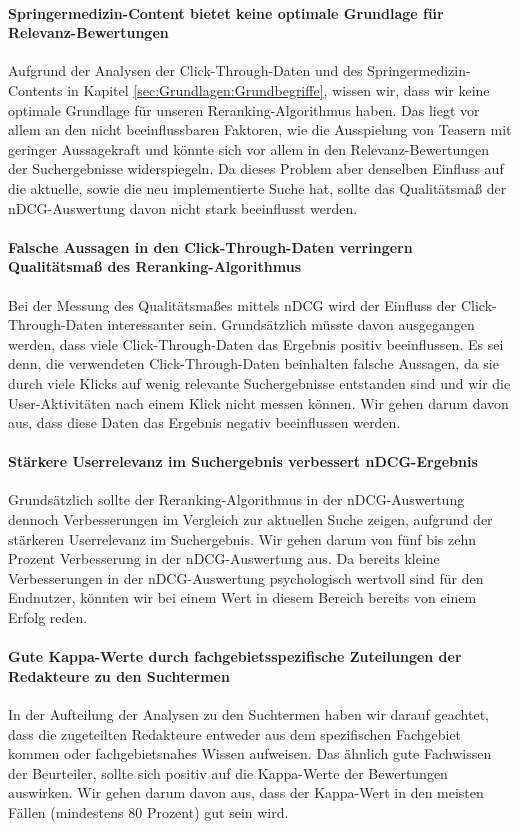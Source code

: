 \paragraph{Springermedizin-Content bietet keine optimale Grundlage für Relevanz-Bewertungen}
Aufgrund der Analysen der Click-Through-Daten und des Springermedizin-Contents in Kapitel \ref{sec:Grundlagen:Grundbegriffe}, wissen wir, dass wir keine optimale Grundlage für unseren Reranking-Algorithmus haben. Das liegt vor allem an den nicht beeinflussbaren Faktoren, wie die Ausspielung von Teasern mit geringer Aussagekraft und könnte sich vor allem in den Relevanz-Bewertungen der Suchergebnisse widerspiegeln. Da dieses Problem aber denselben Einfluss auf die aktuelle, sowie die neu implementierte Suche hat, sollte das Qualitätsmaß der nDCG-Auswertung davon nicht stark beeinflusst werden. 

\paragraph{Falsche Aussagen in den Click-Through-Daten verringern Qualitätsmaß des Reranking-Algorithmus}
Bei der Messung des Qualitätsmaßes mittels nDCG wird der Einfluss der Click-Through-Daten interessanter sein. Grundsätzlich müsste davon ausgegangen werden, dass viele Click-Through-Daten das Ergebnis positiv beeinflussen. Es sei denn, die verwendeten Click-Through-Daten beinhalten falsche Aussagen, da sie durch viele Klicks auf wenig relevante Suchergebnisse entstanden sind und wir die User-Aktivitäten nach einem Klick nicht messen können. Wir gehen darum davon aus, dass diese Daten das Ergebnis negativ beeinflussen werden. 

\paragraph{Stärkere Userrelevanz im Suchergebnis verbessert nDCG-Ergebnis}
Grundsätzlich sollte der Reranking-Algorithmus in der nDCG-Auswertung dennoch Verbesserungen im Vergleich zur aktuellen Suche zeigen, aufgrund der stärkeren Userrelevanz im Suchergebnis. Wir gehen darum von fünf bis zehn Prozent Verbesserung in der nDCG-Auswertung aus. Da bereits kleine Verbesserungen in der nDCG-Auswertung psychologisch wertvoll sind für den Endnutzer, könnten wir bei einem Wert in diesem Bereich bereits von einem Erfolg reden. 

\paragraph{Gute Kappa-Werte durch fachgebietsspezifische Zuteilungen der Redakteure zu den Suchtermen}
In der Aufteilung der Analysen zu den Suchtermen haben wir darauf geachtet, dass die zugeteilten Redakteure entweder aus dem spezifischen Fachgebiet kommen oder fachgebietsnahes Wissen aufweisen. Das ähnlich gute Fachwissen der Beurteiler, sollte sich positiv auf die Kappa-Werte der Bewertungen auswirken. Wir gehen darum davon aus, dass der Kappa-Wert in den meisten Fällen (mindestens 80 Prozent) gut sein wird. 

